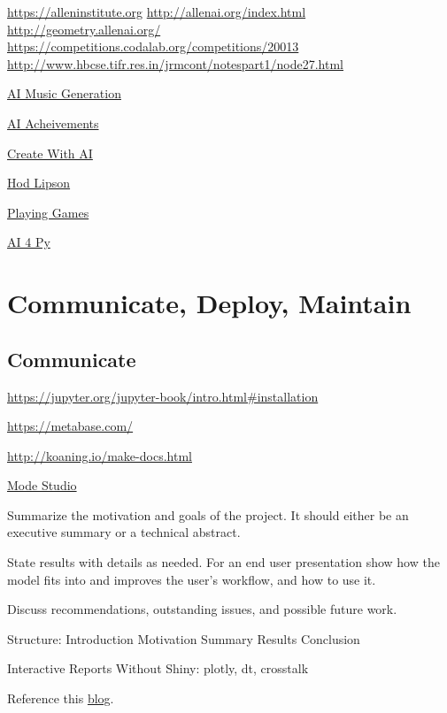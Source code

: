 \documentclass[]{book}
\begin{document}
\url{https://alleninstitute.org} \textbar{} \url{http://allenai.org/index.html} \textbar{} \url{http://geometry.allenai.org/} \textbar{} \url{https://competitions.codalab.org/competitions/20013} \textbar{} \url{http://www.hbcse.tifr.res.in/jrmcont/notespart1/node27.html}

\href{https://www.jukedeck.com}{AI Music Generation}

\href{https://poo.ai/}{AI Acheivements}

\href{http://createwith.ai/}{Create With AI}

\href{http://www.hodlipson.com/}{Hod Lipson}

\href{http://www.ggp.org/}{Playing Games}

\href{https://wiki.python.org/moin/PythonForArtificialIntelligence}{AI 4 Py}

\hypertarget{communicate-deploy-maintain}{%
\chapter{Communicate, Deploy, Maintain}\label{communicate-deploy-maintain}}

\hypertarget{communicate}{%
\section{Communicate}\label{communicate}}

\url{https://jupyter.org/jupyter-book/intro.html\#installation}

\url{https://metabase.com/}

\url{http://koaning.io/make-docs.html}

\href{https://about.modeanalytics.com/}{Mode Studio}

Summarize the motivation and goals of the project. It should either be an executive summary or a technical abstract.

State results with details as needed. For an end user presentation show how the model fits into and improves the user's workflow, and how to use it.

Discuss recommendations, outstanding issues, and possible future work.

Structure: Introduction \textbar{} Motivation \textbar{} Summary \textbar{} Results \textbar{} Conclusion

Interactive Reports Without Shiny: plotly, dt, crosstalk

Reference this \href{https://www.dataquest.io/blog/data-science-project-style-guide/}{blog}.
\end{document}
